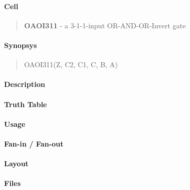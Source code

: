 \label{OAOI311}
\paragraph{Cell}
\begin{quote}
    \textbf{OAOI311} - a 3-1-1-input OR-AND-OR-Invert gate
\end{quote}

\paragraph{Synopsys}
\begin{quote}
    OAOI311(Z, C2, C1, C, B, A)
\end{quote}

\paragraph{Description}

%

\paragraph{Truth Table}
%

\paragraph{Usage}

\paragraph{Fan-in / Fan-out}

\paragraph{Layout}

\paragraph{Files}
